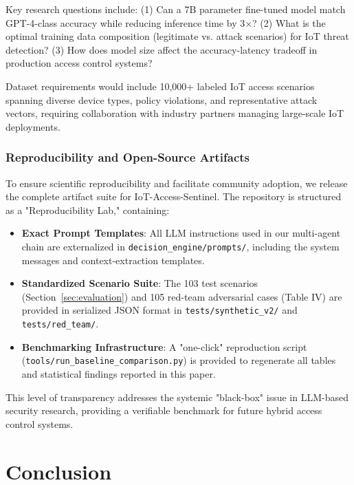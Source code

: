 \documentclass[conference]{IEEEtran}
\begin{document}
Key research questions include: (1) Can a 7B parameter fine-tuned model match GPT-4-class accuracy while reducing inference time by 3×? (2) What is the optimal training data composition (legitimate vs. attack scenarios) for IoT threat detection? (3) How does model size affect the accuracy-latency tradeoff in production access control systems?

Dataset requirements would include 10,000+ labeled IoT access scenarios spanning diverse device types, policy violations, and representative attack vectors, requiring collaboration with industry partners managing large-scale IoT deployments.

\subsubsection{Reproducibility and Open-Source Artifacts}

To ensure scientific reproducibility and facilitate community adoption, we release the complete artifact suite for IoT-Access-Sentinel. The repository is structured as a "Reproducibility Lab," containing:

\begin{itemize}
    \item \textbf{Exact Prompt Templates}: All LLM instructions used in our multi-agent chain are externalized in \texttt{decision\_engine/prompts/}, including the system messages and context-extraction templates.
    \item \textbf{Standardized Scenario Suite}: The 103 test scenarios (Section~\ref{sec:evaluation}) and 105 red-team adversarial cases (Table IV) are provided in serialized JSON format in \texttt{tests/synthetic\_v2/} and \texttt{tests/red\_team/}.
    \item \textbf{Benchmarking Infrastructure}: A "one-click" reproduction script (\texttt{tools/run\_baseline\_comparison.py}) is provided to regenerate all tables and statistical findings reported in this paper.
\end{itemize}

This level of transparency addresses the systemic "black-box" issue in LLM-based security research, providing a verifiable benchmark for future hybrid access control systems.

\section{Conclusion}
\end{document}
